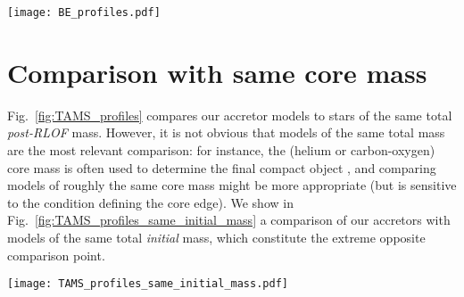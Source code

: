 \documentclass[twocolumn,twocolappendix,trackchanges]{aastex63}
\DeclareRobustCommand{\Figref}[1]{Fig.~\ref{#1}}
\begin{document}
\begin{figure*}[hbtp]
  \texttt{[image: BE\_profiles.pdf]}
  \caption{Binding energy profile at fixed photospheric radius $R$
    (right y-axis) as a function of radial coordinate $r$. We only
    show profiles with $\alpha_\mathrm{th}=1$, that is accounting for
    the internal energy content of the star. Orange, red, and other
    colors show respectively the accretor models, single stars of same
    post-RLOF total mass, and engineered models with varying CEB
    steepness \textcolor{blue}{(increasing CEB size from blue to
      yellow, cf.~\Figref{fig:TAMS_profiles})}. Titles indicates the pre-RLOF and approximate
    post-RLOF accretor masses. The vertical colored lines mark the
    outer edge of the helium cores of the accretor and single star,
    that is the outermost location where $Y>0.1$ and $X<0.01$ (solid
    lines), or $X<0.1$ (dashed), or $X<0.2$ (dot-dashed). The dotted
    gray lines mark the total radius $R$ of these models.}
  \label{fig:BE_profiles}
\end{figure*}


\newpage
\section{Comparison with same core mass}
\label{sec:same_core}

\Figref{fig:TAMS_profiles} compares our accretor models to stars of
the same total \emph{post-RLOF} mass. However, it is not obvious that models
of the same total mass are the most relevant comparison: for instance,
the (helium or carbon-oxygen) core mass is often used to determine the
final compact object \citep[e.g.,][]{fryer:2012, farmer:2019,
  patton:2020, renzo:2022, fryer:2022}, and comparing models of
roughly the same core mass might be more appropriate (but is sensitive
to the condition defining the core edge). We show in
\Figref{fig:TAMS_profiles_same_initial_mass} a comparison of our
accretors with models of the same total \emph{initial} mass, which
constitute the extreme opposite comparison point.


\begin{figure*}[htbp]
  \centering
  \texttt{[image: TAMS\_profiles\_same\_initial\_mass.pdf]}
  \caption{Specific entropy (top row), H (bottom row, solid lines),
    and He (bottom row, dashed lines) profiles for non-rotating single
    stars (red), accretors (orange), and ``engineered'' models of the
    same total mass as the ZAMS mass of the accretors. The overlapping
    gray bands emphasize the CEB region, \textcolor{blue}{increasing
      in size from blue to yellow in the engineered models}.}
  \label{fig:TAMS_profiles_same_initial_mass}
\end{figure*}
\end{document}
